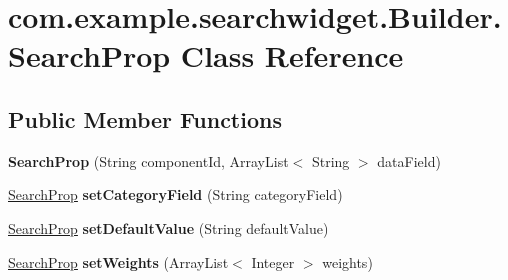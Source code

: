 \hypertarget{classcom_1_1example_1_1searchwidget_1_1_builder_1_1_search_prop}{}\section{com.\+example.\+searchwidget.\+Builder.\+Search\+Prop Class Reference}
\label{classcom_1_1example_1_1searchwidget_1_1_builder_1_1_search_prop}
\subsection*{Public Member Functions}
\begin{DoxyCompactItemize}
\item 
\mbox{\label{classcom_1_1example_1_1searchwidget_1_1_builder_1_1_search_prop_ac87a0dbc238f1faed13afaac53d378fe}} 
{\bfseries Search\+Prop} (String component\+Id, Array\+List$<$ String $>$ data\+Field)
\item 
\mbox{\label{classcom_1_1example_1_1searchwidget_1_1_builder_1_1_search_prop_af270013263a372ca06b52789d9fee752}} 
\mbox{\hyperlink{classcom_1_1example_1_1searchwidget_1_1_builder_1_1_search_prop}{Search\+Prop}} {\bfseries set\+Category\+Field} (String category\+Field)
\item 
\mbox{\label{classcom_1_1example_1_1searchwidget_1_1_builder_1_1_search_prop_ae5198e7d95338a48b751e8aa441ef138}} 
\mbox{\hyperlink{classcom_1_1example_1_1searchwidget_1_1_builder_1_1_search_prop}{Search\+Prop}} {\bfseries set\+Default\+Value} (String default\+Value)
\item 
\mbox{\label{classcom_1_1example_1_1searchwidget_1_1_builder_1_1_search_prop_a5b1de91451f74cc827ed342ac134f39c}} 
\mbox{\hyperlink{classcom_1_1example_1_1searchwidget_1_1_builder_1_1_search_prop}{Search\+Prop}} {\bfseries set\+Weights} (Array\+List$<$ Integer $>$ weights)
\item 
\mbox{\label{classcom_1_1example_1_1searchwidget_1_1_builder_1_1_search_prop_a6cc9d28e94707f7877b7e6d90e895f57}} 

\end{DoxyCompactItemize}
